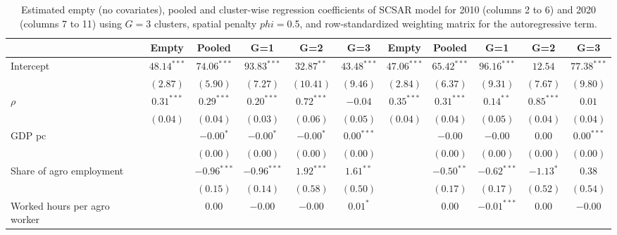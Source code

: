 
\begin{table}
\caption{Estimated empty (no covariates), pooled and cluster-wise regression coefficients of SCSAR model for 2010 (columns 2 to 6) and 2020 (columns 7 to 11) using $G=$3 clusters, spatial penalty $phi=$0.5, and row-standardized weighting matrix for the autoregressive term.}
\begin{center}
\begin{tabular}{l c c c c c c c c c c}
\hline
 & Empty & Pooled & G=1 & G=2 & G=3 & Empty & Pooled & G=1 & G=2 & G=3 \\
\hline
Intercept                         & $48.14^{***}$ & $74.06^{***}$ & $93.83^{***}$ & $32.87^{**}$ & $43.48^{***}$ & $47.06^{***}$ & $65.42^{***}$ & $96.16^{***}$ & $12.54$      & $77.38^{***}$ \\
                                  & $(2.87)$      & $(5.90)$      & $(7.27)$      & $(10.41)$    & $(9.46)$      & $(2.84)$      & $(6.37)$      & $(9.31)$      & $(7.67)$     & $(9.80)$      \\
$\rho$                            & $0.31^{***}$  & $0.29^{***}$  & $0.20^{***}$  & $0.72^{***}$ & $-0.04$       & $0.35^{***}$  & $0.31^{***}$  & $0.14^{**}$   & $0.85^{***}$ & $0.01$        \\
                                  & $(0.04)$      & $(0.04)$      & $(0.03)$      & $(0.06)$     & $(0.05)$      & $(0.04)$      & $(0.04)$      & $(0.05)$      & $(0.04)$     & $(0.04)$      \\
GDP pc                            &               & $-0.00^{*}$   & $-0.00^{*}$   & $-0.00^{*}$  & $0.00^{***}$  &               & $-0.00$       & $-0.00$       & $0.00$       & $0.00^{***}$  \\
                                  &               & $(0.00)$      & $(0.00)$      & $(0.00)$     & $(0.00)$      &               & $(0.00)$      & $(0.00)$      & $(0.00)$     & $(0.00)$      \\
Share of agro employment          &               & $-0.96^{***}$ & $-0.96^{***}$ & $1.92^{***}$ & $1.61^{**}$   &               & $-0.50^{**}$  & $-0.62^{***}$ & $-1.13^{*}$  & $0.38$        \\
                                  &               & $(0.15)$      & $(0.14)$      & $(0.58)$     & $(0.50)$      &               & $(0.17)$      & $(0.17)$      & $(0.52)$     & $(0.54)$      \\
Worked hours per agro worker      &               & $0.00$        & $-0.00$       & $-0.00$      & $0.01^{*}$    &               & $0.00$        & $-0.01^{***}$ & $0.00$       & $-0.00$       \\

\end{tabular}
\end{center}
\end{table}
